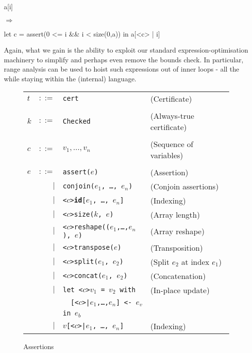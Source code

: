 \begin{minipage}{0.1\columnwidth}
\begin{center}
\begin{colorcode}
a[i]
\end{colorcode}
\end{center}
\end{minipage}
$\Rightarrow$
\begin{minipage}{0.46\columnwidth}
\begin{center}
\begin{colorcode}
let c = assert(0 <= i && i < size(0,a)) in
a[<c> | i]
\end{colorcode}
\end{center}
\end{minipage}

Again, what we gain is the ability to exploit our standard
expression-optimisation machinery to simplify and perhaps even remove
the bounds check.  In particular, range analysis can be used to hoist such expressions out of inner loops
- all the while staying within the (internal) \LO{} language.

\begin{figure}[bt]
\begin{tabular}{lrll}
$t$ & $::=$ & \texttt{cert} & (Certificate) \\
\\
$k$ & $::=$ & \texttt{Checked} & (Always-true certificate) \\
\\
$c$ & $::=$ & $v_1, \ldots ,v_{n}$ & (Sequence of variables) \\
\\
$e$ & $::=$ & \texttt{assert($e$)} & (Assertion) \\
& $|$ & \texttt{conjoin($e_{1}$, \ldots, $e_{n}$)} & (Conjoin assertions) \\
& $|$ & \texttt{<$c$>\textbf{id}[$e_{1}$, \ldots, $e_{n}$]} & (Indexing) \\
& $|$ & \texttt{<$c$>size($k$, $e$)} & (Array length) \\
& $|$ & \texttt{<$c$>reshape(($e_{1}$,\ldots,$e_{n}$), $e$)} & (Array reshape) \\
& $|$ & \texttt{<$c$>transpose($e$)} & (Transposition) \\
& $|$ & \texttt{<$c$>split($e_{1}$, $e_{2}$)} & (Split $e_{2}$ at index $e_{1}$) \\
& $|$ & \texttt{<$c$>concat($e_{1}$, $e_{2}$)} & (Concatenation) \\
& $|$ & \texttt{let <$c$>$v_{1}$ = $v_{2}$ with} & (In-place update) \\
&     & \texttt{\ \ [<$c$>|$e_{1}$,\ldots,$e_{n}$] <- $e_{v}$} \\
&     & \texttt{in $e_{b}$} \\
& $|$ & \texttt{$v$[<$c$>|$e_{1}$, \ldots, $e_{n}$]} & (Indexing) \\
\end{tabular}
\caption{Assertions}
\label{fig:assertions}
\end{figure}

